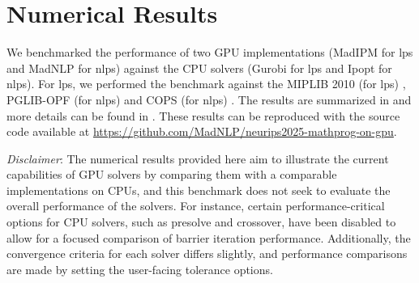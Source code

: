 \documentclass{article}
\begin{document}
\section{Numerical Results}\label{eqn:num} 
We benchmarked the performance of two GPU implementations (MadIPM for \glspl*{lp} and MadNLP for \glspl*{nlp}) against the CPU solvers (Gurobi for \glspl*{lp} and Ipopt for \glspl*{nlp}).
For \glspl*{lp}, we performed the benchmark against the MIPLIB 2010 (for \glspl*{lp}) \cite{kochMIPLIB20102011}, PGLIB-OPF (for \glspl*{nlp}) \cite{babaeinejadsarookolaeePowerGridLibrary2021} and COPS (for \glspl*{nlp}) \cite{dolanBenchmarkingOptimizationSoftware2001}.
The results are summarized in  and more details can be found in .
These results can be reproduced with the source code available at \url{https://github.com/MadNLP/neurips2025-mathprog-on-gpu}.


\textit{Disclaimer}: The numerical results provided here aim to illustrate the current capabilities of GPU solvers by comparing them with a comparable implementations on CPUs, and this benchmark does not seek to evaluate the overall performance of the solvers. For instance, certain performance-critical options for CPU solvers, such as presolve and crossover, have been disabled to allow for a focused comparison of barrier iteration performance. Additionally, the convergence criteria for each solver differs slightly, and performance comparisons are made by setting the user-facing tolerance options.

\begin{table} 
  \footnotesize
  
  \caption{Solution times for CPU solvers (Gurobi and Ipopt) and GPU solvers (MadIPM and MadNLP) are represented using SGM10, defined as $(\prod_{i=1}^n (t_i +10))^{1/n} - 10$, where $t_i$ denotes the solve time for the $i$-th instance (in seconds; unsolved instances are assigned a maximum wall time of 900 seconds) across various datasets: MIPLIB (88 small, 58 medium, and 28 large \glspl*{lp}), PGLIB-OPF (31 small, 24 medium, and 11 large \glspl*{nlp}), and COPS (13 small, 16 medium, and 16 large \glspl*{nlp}). For Gurobi, the Barrier method is used, with both the Presolve and Crossover options disabled. MadNLP is configured with cuDSS, while Ipopt is configured with either Ma27 (for PGLIB-OPF) or Ma57 (for COPS). All \glspl*{nlp} are modeled using ExaModels. The benchmarking was conducted on a workstation equipped with two Intel Xeon Gold 6130 CPUs operating at 2.10GHz, two Quadro GV~100 GPUs, and 128 GB of RAM running at 2400 MT/s.
  }
  \label{tab:results} 
\end{table}
\end{document}
